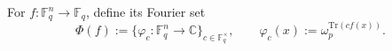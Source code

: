 \begin{definition}
\label{def:fourier-set}
\leanok
For $f : \mathbb{F}_q^n \to \mathbb{F}_q$, define its Fourier set
  \[
    \Phi(f) := \{\varphi_c : \mathbb{F}_q^n \to \mathbb{C}\}_{c \in \mathbb{F}_q^\times},
    \qquad
    \varphi_c(x) := \omega_p^{\mathrm{Tr}(c f(x))}.
  \]
\end{definition}
